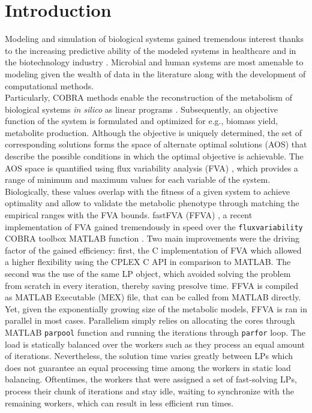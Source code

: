 \section{Introduction}
Modeling and simulation of biological systems gained tremendous interest thanks to the increasing predictive ability of the modeled systems in healthcare and in the biotechnology industry \cite{gottstein2016constraint,oyaas2017genome}. Microbial and human systems are most amenable to modeling given the wealth of data in the literature along with the development of computational methods. \\
Particularly, COBRA methods enable the reconstruction of the metabolism of biological systems \textit{in silico} as linear programs \cite{o2015using}. Subsequently, an objective function of the system is formulated and optimized for e.g., biomass yield, metabolite production. Although the objective is uniquely determined, the set of corresponding solutions forms the space of alternate optimal solutions (AOS) that describe the possible conditions in which the optimal objective is achievable. The AOS space is quantified using flux variability analysis (FVA) \cite{mahadevan2003effects}, which provides a range of minimum and maximum values for each variable of the system. Biologically, these values overlap with the fitness of a given system to achieve optimality and allow to validate the metabolic phenotype through matching the empirical ranges with the FVA bounds.
fastFVA (FFVA) \cite{gudmundsson2010computationally}, a recent implementation of FVA gained tremendously in speed over the \texttt{fluxvariability} COBRA toolbox MATLAB function \cite{becker2007quantitative}. Two main improvements were the driving factor of the gained efficiency: first, the C implementation of FVA which allowed a higher flexibility using the CPLEX C API in comparison to MATLAB. The second was the use of the same LP object, which avoided solving the problem from scratch in every iteration, thereby saving presolve time. FFVA is compiled as MATLAB Executable (MEX) file, that can be called from MATLAB directly.\\
Yet, given the exponentially growing size of the metabolic models, FFVA is ran in parallel in most cases. Parallelism simply relies on allocating the cores through MATLAB \texttt{parpool} function and running the iterations through \texttt{parfor} loop. The load is statically balanced over the workers such as they process an equal amount of iterations. Nevertheless, the solution time varies greatly between LPs which does not guarantee an equal processing time among the workers in static load balancing. Oftentimes, the workers that were assigned a set of fast-solving LPs, process their chunk of iterations and stay idle, waiting to synchronize with the remaining workers, which can result in less efficient run times.
